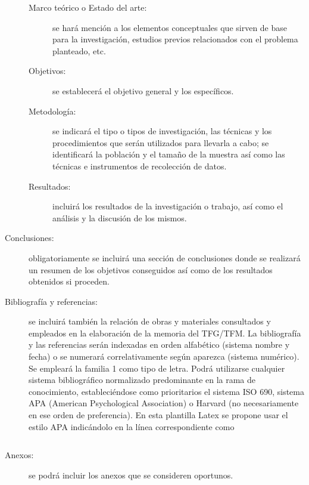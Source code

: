 \begin{description}
\begin{description}
\item[Marco teórico o Estado del arte:] se hará mención a los elementos conceptuales que sirven de base para la investigación, estudios previos relacionados con el problema planteado, etc.
\item[Objetivos:] se establecerá el objetivo general y los específicos.
\item[Metodología:] se indicará el tipo o tipos de investigación, las técnicas y los procedimientos que serán utilizados para llevarla a cabo; se identificará la población y el tamaño de la muestra así como las técnicas e instrumentos de recolección de datos.
\item[Resultados:] incluirá los resultados de la investigación o trabajo, así como el análisis y la discusión de los mismos.
\end{description}
\item[Conclusiones:] obligatoriamente se incluirá una sección de conclusiones donde se realizará un resumen de los objetivos conseguidos así como de los resultados obtenidos si proceden.
\item[Bibliografía y referencias:] se incluirá también la relación de obras y materiales consultados y empleados en la elaboración de la memoria del TFG/TFM. La bibliografía y las referencias serán indexadas en orden alfabético (sistema nombre y fecha) o se numerará correlativamente según aparezca (sistema numérico). Se empleará la familia 1 como tipo de letra. Podrá utilizarse cualquier sistema bibliográfico normalizado predominante en la rama de conocimiento, estableciéndose como prioritarios el sistema ISO 690, sistema APA (American Psychological Association) o Harvard (no necesariamente en ese orden de preferencia). En esta plantilla Latex se propone usar el estilo APA indicándolo en la línea correspondiente como 
\begin{verbatim}

\end{verbatim}


\item[Anexos:] se podrá incluir los anexos que se consideren oportunos.

\end{description}



